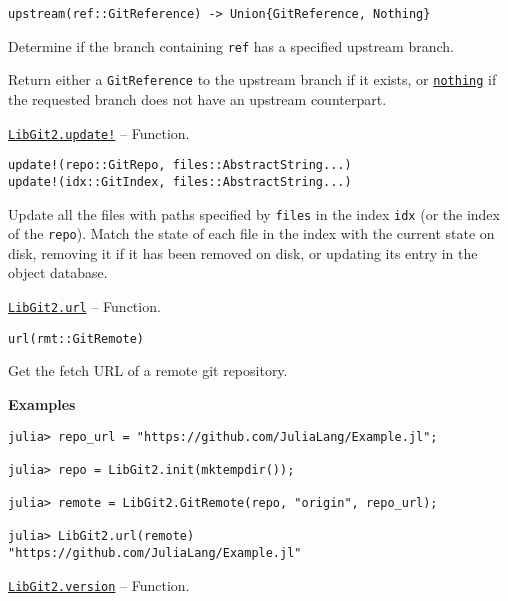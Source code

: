 \begin{adjustwidth}{2em}{0pt}


\begin{verbatim}
upstream(ref::GitReference) -> Union{GitReference, Nothing}
\end{verbatim}

Determine if the branch containing \texttt{ref} has a specified upstream branch.

Return either a \texttt{GitReference} to the upstream branch if it exists, or \hyperlink{9331422207248206047}{\texttt{nothing}} if the requested branch does not have an upstream counterpart.



\end{adjustwidth}
\hypertarget{3010892674015914384}{} 
\hyperlink{3010892674015914384}{\texttt{LibGit2.update!}}  -- {Function.}

\begin{adjustwidth}{2em}{0pt}


\begin{verbatim}
update!(repo::GitRepo, files::AbstractString...)
update!(idx::GitIndex, files::AbstractString...)
\end{verbatim}

Update all the files with paths specified by \texttt{files} in the index \texttt{idx} (or the index of the \texttt{repo}). Match the state of each file in the index with the current state on disk, removing it if it has been removed on disk, or updating its entry in the object database.



\end{adjustwidth}
\hypertarget{2040666647044196560}{} 
\hyperlink{2040666647044196560}{\texttt{LibGit2.url}}  -- {Function.}

\begin{adjustwidth}{2em}{0pt}


\begin{verbatim}
url(rmt::GitRemote)
\end{verbatim}

Get the fetch URL of a remote git repository.

\textbf{Examples}


\begin{verbatim}
julia> repo_url = "https://github.com/JuliaLang/Example.jl";

julia> repo = LibGit2.init(mktempdir());

julia> remote = LibGit2.GitRemote(repo, "origin", repo_url);

julia> LibGit2.url(remote)
"https://github.com/JuliaLang/Example.jl"
\end{verbatim}



\end{adjustwidth}
\hypertarget{18107764583308594889}{} 
\hyperlink{18107764583308594889}{\texttt{LibGit2.version}}  -- {Function.}

